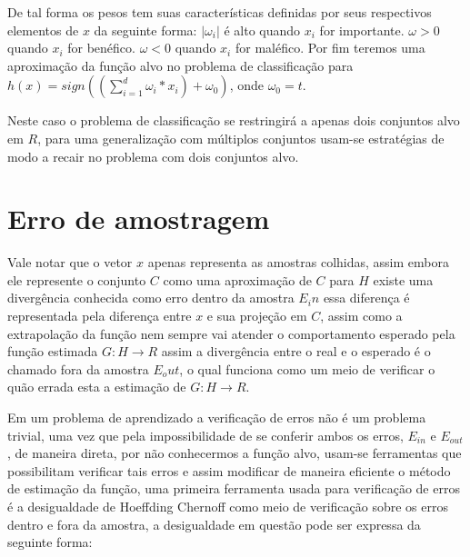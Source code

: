 \documentclass[pfc]{imetex}
\begin{document}
    De tal forma os pesos tem suas características definidas por seus respectivos elementos de $x$ da seguinte forma:\newline
    $|\omega_i|$ é alto quando $x_i$ for importante.\newline
    $\omega > 0$ quando $x_i$ for benéfico.\newline
    $\omega < 0$ quando $x_i$ for maléfico.\newline
    Por fim teremos uma aproximação da função alvo no problema de classificação para $h(x) = sign((\sum\limits_{i=1}^d \omega_i*x_i)+\omega_0)$, onde $\omega_0 = t$.

    Neste caso o problema de classificação se restringirá a apenas dois conjuntos alvo em $R$, para uma generalização com múltiplos conjuntos usam-se estratégias de modo a recair no problema com dois conjuntos alvo.

\section{Erro de amostragem}

    Vale notar que o vetor $x$ apenas representa as amostras colhidas, assim embora ele represente o conjunto $C$ como uma aproximação de $C$ para $H$ existe uma divergência conhecida como erro dentro da amostra $E_in$ essa diferença é representada pela diferença entre $x$ e sua projeção em $C$, assim como a extrapolação da função nem sempre vai atender o comportamento esperado pela função estimada $G: H \rightarrow R$ assim a divergência entre o real e o esperado é o chamado fora da amostra $E_out$, o qual funciona como um meio de verificar o quão errada esta a estimação de $G: H \rightarrow R$.

    Em um problema de aprendizado a verificação de erros não é um problema trivial, uma vez que pela impossibilidade de se conferir ambos os erros, $E_{in}$ e $E_{out}$, de maneira direta, por não conhecermos a função alvo, usam-se ferramentas que possibilitam verificar tais erros e assim modificar de maneira eficiente o método de estimação da função, uma primeira ferramenta usada para verificação de erros é a desigualdade de Hoeffding Chernoff como meio de verificação sobre os erros dentro e fora da amostra, a desigualdade em questão pode ser expressa da seguinte forma:
\end{document}

